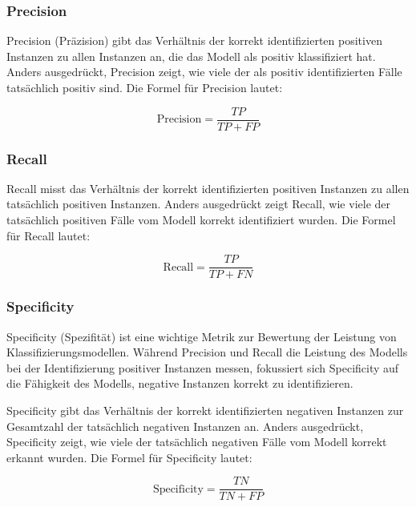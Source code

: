 \subsubsection{Precision} \label{chap:precision}
Precision (Präzision) gibt das Verhältnis der korrekt identifizierten positiven Instanzen zu allen Instanzen an, die das Modell als positiv klassifiziert hat. Anders ausgedrückt, Precision zeigt, wie viele der als positiv identifizierten Fälle tatsächlich positiv sind. Die Formel für Precision lautet:

\begin{equation}
    \text{Precision} = \frac{TP}{TP + FP}
    \label{eq:PrecisionFormula}
\end{equation}

\subsubsection{Recall} \label{chap:recall}
Recall misst das Verhältnis der korrekt identifizierten positiven Instanzen zu allen tatsächlich positiven Instanzen. Anders ausgedrückt zeigt Recall, wie viele der tatsächlich positiven Fälle vom Modell korrekt identifiziert wurden. Die Formel für Recall lautet:

\begin{equation}
    \text{Recall} = \frac{TP}{TP + FN}
    \label{eq:RecallFormula}
\end{equation}

\subsubsection{Specificity} \label{chap:specificity}
Specificity (Spezifität) ist eine wichtige Metrik zur Bewertung der Leistung von Klassifizierungsmodellen. Während Precision und Recall die Leistung des Modells bei der Identifizierung positiver Instanzen messen, fokussiert sich Specificity auf die Fähigkeit des Modells, negative Instanzen korrekt zu identifizieren.

Specificity gibt das Verhältnis der korrekt identifizierten negativen Instanzen zur Gesamtzahl der tatsächlich negativen Instanzen an. Anders ausgedrückt, Specificity zeigt, wie viele der tatsächlich negativen Fälle vom Modell korrekt erkannt wurden. Die Formel für Specificity lautet:

\begin{equation}
    \text{Specificity} = \frac{TN}{TN + FP}
    \label{eq:SpecificityFormula}
\end{equation}

